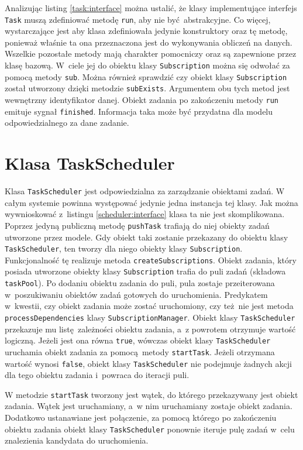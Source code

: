 Analizując listing \ref{task:interface} można ustalić, że klasy implementujące interfejs \lstinline$Task$ muszą zdefiniować metodę \lstinline$run$, aby nie być abstrakcyjne. Co więcej, wystarczające jest aby klasa zdefiniowała jedynie konstruktory oraz tę metodę, ponieważ właśnie ta ona przeznaczona jest do wykonywania obliczeń na danych. Wszelkie pozostałe metody mają charakter pomocniczy oraz są zapewnione przez klasę bazową. W~ciele jej do obiektu klasy \lstinline$Subscription$ można się odwołać za pomocą metody \lstinline$sub$. Można również sprawdzić czy obiekt klasy \lstinline$Subscription$ został utworzony dzięki metodzie \lstinline$subExists$. Argumentem obu tych metod jest wewnętrzny identyfikator danej. Obiekt zadania po zakończeniu metody \lstinline$run$ emituje sygnał \lstinline$finished$. Informacja taka może być przydatna dla modelu odpowiedzialnego za dane zadanie.

\section{Klasa TaskScheduler} 
Klasa \lstinline$TaskScheduler$ jest odpowiedzialna za zarządzanie obiektami zadań. W całym systemie powinna występować jedynie jedna instancja tej klasy. Jak można wywnioskować z~listingu \ref{scheduler:interface} klasa ta nie jest skomplikowana. Poprzez jedyną publiczną metodę \lstinline$pushTask$ trafiają do niej obiekty zadań utworzone przez modele. Gdy obiekt taki zostanie przekazany do obiektu klasy \lstinline$TaskScheduler$, ten tworzy dla niego obiekty klasy \lstinline$Subscription$. Funkcjonalność tę realizuje metoda \lstinline$createSubscriptions$. Obiekt zadania, który posiada utworzone obiekty klasy \lstinline$Subscription$ trafia do puli zadań (składowa \lstinline$taskPool$). Po dodaniu obiektu zadania do puli, pula zostaje przeiterowana w~poszukiwaniu obiektów zadań gotowych do uruchomienia. Predykatem w~kwestii, czy obiekt zadania może zostać uruchomiony, czy też nie jest metoda \lstinline$processDependencies$ klasy \lstinline$SubscriptionManager$. Obiekt klasy \lstinline$TaskScheduler$ przekazuje mu listę zależności obiektu zadania, a~z powrotem otrzymuje wartość logiczną. Jeżeli jest ona równa \lstinline$true$, wówczas obiekt klasy \lstinline$TaskScheduler$ uruchamia obiekt zadania za pomocą metody \lstinline$startTask$. Jeżeli otrzymana wartość wynosi \lstinline$false$, obiekt klasy \lstinline$TaskScheduler$ nie podejmuje żadnych akcji dla tego obiektu zadania i~powraca do iteracji puli.

W metodzie \lstinline$startTask$ tworzony jest wątek, do którego przekazywany jest obiekt zadania. Wątek jest uruchamiany, a~w nim uruchamiany zostaje obiekt zadania. Dodatkowo ustanawiane jest połączenie, za pomocą którego po zakończeniu obiektu zadania obiekt klasy \lstinline$TaskScheduler$ ponownie iteruje pulę zadań w~celu znalezienia kandydata do uruchomienia. 

